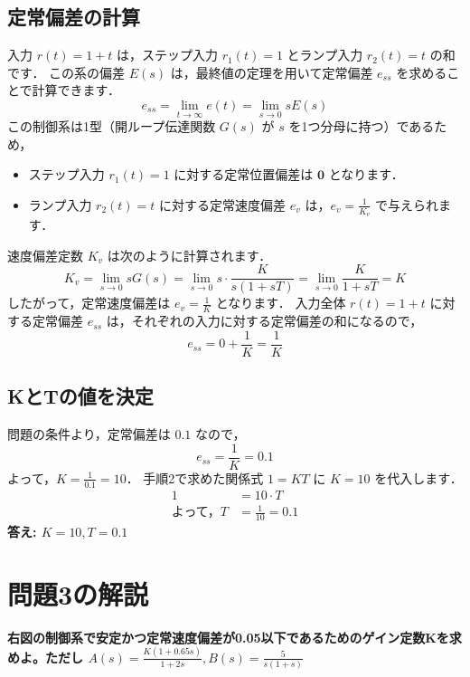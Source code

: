 \documentclass[11pt,a4paper]{ltjsarticle}
\begin{document}
\subsection{定常偏差の計算}
入力 $r(t)=1+t$ は，ステップ入力 $r_1(t)=1$ とランプ入力 $r_2(t)=t$ の和です．
この系の偏差 $E(s)$ は，最終値の定理を用いて定常偏差 $e_{ss}$ を求めることで計算できます．
\begin{equation*}
    e_{ss} = \lim_{t \to \infty} e(t) = \lim_{s \to 0} sE(s)
\end{equation*}
この制御系は1型（開ループ伝達関数 $G(s)$ が $s$ を1つ分母に持つ）であるため，
\begin{itemize}
    \item ステップ入力 $r_1(t)=1$ に対する定常位置偏差は $\mathbf{0}$ となります．
    \item ランプ入力 $r_2(t)=t$ に対する定常速度偏差 $e_v$ は，$e_v = \frac{1}{K_v}$ で与えられます．
\end{itemize}
速度偏差定数 $K_v$ は次のように計算されます．
\begin{equation*}
    K_v = \lim_{s \to 0} sG(s) = \lim_{s \to 0} s \cdot \frac{K}{s(1+sT)} = \lim_{s \to 0} \frac{K}{1+sT} = K
\end{equation*}
したがって，定常速度偏差は $e_v = \frac{1}{K}$ となります．
入力全体 $r(t)=1+t$ に対する定常偏差 $e_{ss}$ は，それぞれの入力に対する定常偏差の和になるので，
\begin{equation*}
    e_{ss} = 0 + \frac{1}{K} = \frac{1}{K}
\end{equation*}

\subsection{KとTの値を決定}
問題の条件より，定常偏差は $0.1$ なので，
\begin{equation*}
    e_{ss} = \frac{1}{K} = 0.1
\end{equation*}
よって，$K = \frac{1}{0.1} = 10$．
手順2で求めた関係式 $1=KT$ に $K=10$ を代入します．
\begin{align*}
    1 &= 10 \cdot T \\
    \text{よって，} T &= \frac{1}{10} = 0.1
\end{align*}
\textbf{答え: $K=10, T=0.1$}

\section{問題3の解説}
\textbf{右図の制御系で安定かつ定常速度偏差が0.05以下であるためのゲイン定数Kを求めよ。ただし $A(s)=\frac{K(1+0.65s)}{1+2s}, B(s)=\frac{5}{s(1+s)}$}
\end{document}
